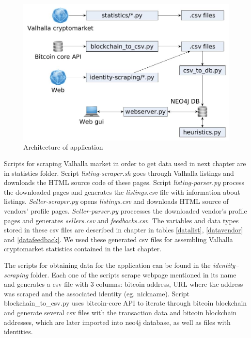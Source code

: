 \documentclass[
  digital, %
  table,   %
  lof,     %
  lot,     %
  oneside
]{fithesis3}
\begin{document}
\begin{figure}[!htb]
    \centering
    \includegraphics[width=1\textwidth]{application_architecture}
    \caption{Architecture of application}
    \label{application_architecture}
\end{figure}

Scripts for scraping Valhalla market in order to get data used in next chapter are in statistics folder.
Script \emph{listing-scraper.sh} goes through Valhalla listings and downloads the HTML source code of these pages.
Script \emph{listing-parser.py} process the downloaded pages and generates the \emph{listings.csv} file with information about listings.
\emph{Seller-scraper.py} opens \emph{listings.csv} and downloads HTML source of vendors' profile pages. 
\emph{Seller-parser.py} proccesses the downloaded vendor's profile pages and generates \emph{sellers.csv} and \emph{feedbacks.csv}.
The variables and data types stored in these csv files are described in chapter \label{Valhalla cryptomarket webscraping}
in tables \ref{datalist}, \ref{datavendor} and \ref{datafeedback}. We used these generated csv files for
assembling Valhalla cryptomarket statistics contained in the last chapter.

The scripts for obtaining data for the application can be found in the \emph{identity--scraping} folder.
Each one of the scripts scrape webpage mentioned
in its name and generates a csv file with 3 columns:
bitcoin address, URL where the address was scraped and the associated identity (eg. nickname).
Script blockchain\_to\_csv.py uses bitcoin-core API to iterate through bitcoin blockchain 
and generate several csv files with the transaction data and bitcoin blockchain addresses, which are later imported into neo4j database, as well as 
files with identities.
\end{document}
